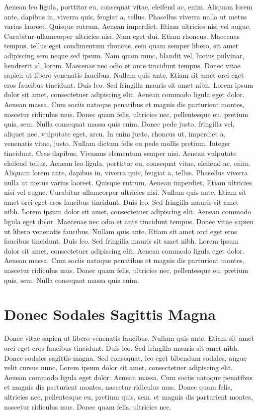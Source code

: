 Aenean leo ligula, porttitor eu, consequat vitae, eleifend ac, enim. Aliquam lorem ante, dapibus in, viverra quis, feugiat a, tellus. Phasellus viverra nulla ut metus varius laoreet. Quisque rutrum. Aenean imperdiet. Etiam ultricies nisi vel augue. Curabitur ullamcorper ultricies nisi. Nam eget dui. Etiam rhoncus. Maecenas tempus, tellus eget condimentum rhoncus, sem quam semper libero, sit amet adipiscing sem neque sed ipsum. Nam quam nunc, blandit vel, luctus pulvinar, hendrerit id, lorem. Maecenas nec odio et ante tincidunt tempus. Donec vitae sapien ut libero venenatis faucibus. Nullam quis ante. Etiam sit amet orci eget eros faucibus tincidunt. Duis leo. Sed fringilla mauris sit amet nibh. Lorem ipsum dolor sit amet, consectetuer adipiscing elit. Aenean commodo ligula eget dolor. Aenean massa. Cum sociis natoque penatibus et magnis dis parturient montes, nascetur ridiculus mus. Donec quam felis, ultricies nec, pellentesque eu, pretium quis, sem. Nulla consequat massa quis enim. Donec pede justo, fringilla vel, aliquet nec, vulputate eget, arcu. In enim justo, rhoncus ut, imperdiet a, venenatis vitae, justo. Nullam dictum felis eu pede mollis pretium. Integer tincidunt. Cras dapibus. Vivamus elementum semper nisi. Aenean vulputate eleifend tellus. Aenean leo ligula, porttitor eu, consequat vitae, eleifend ac, enim. Aliquam lorem ante, dapibus in, viverra quis, feugiat a, tellus. Phasellus viverra nulla ut metus varius laoreet. Quisque rutrum. Aenean imperdiet. Etiam ultricies nisi vel augue. Curabitur ullamcorper ultricies nisi. Nullam quis ante. Etiam sit amet orci eget eros faucibus tincidunt. Duis leo. Sed fringilla mauris sit amet nibh. Lorem ipsum dolor sit amet, consectetuer adipiscing elit. Aenean commodo ligula eget dolor. Maecenas nec odio et ante tincidunt tempus. Donec vitae sapien ut libero venenatis faucibus. Nullam quis ante. Etiam sit amet orci eget eros faucibus tincidunt. Duis leo. Sed fringilla mauris sit amet nibh. Lorem ipsum dolor sit amet, consectetuer adipiscing elit. Aenean commodo ligula eget dolor. Aenean massa. Cum sociis natoque penatibus et magnis dis parturient montes, nascetur ridiculus mus. Donec quam felis, ultricies nec, pellentesque eu, pretium quis, sem. Nulla consequat massa quis enim.

\section{Donec Sodales Sagittis Magna}

Donec vitae sapien ut libero venenatis faucibus. Nullam quis ante. Etiam sit amet orci eget eros faucibus tincidunt. Duis leo. Sed fringilla mauris sit amet nibh. Donec sodales sagittis magna. Sed consequat, leo eget bibendum sodales, augue velit cursus nunc, Lorem ipsum dolor sit amet, consectetuer adipiscing elit. Aenean commodo ligula eget dolor. Aenean massa. Cum sociis natoque penatibus et magnis dis parturient montes, nascetur ridiculus mus. Donec quam felis, ultricies nec, pellentesque eu, pretium quis, sem. et magnis dis parturient montes, nascetur ridiculus mus. Donec quam felis, ultricies nec.

